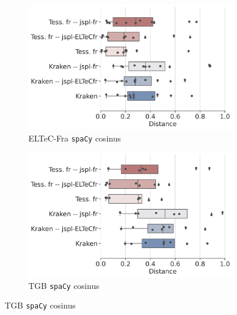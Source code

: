 \begin{figure}[h!]

    \begin{subfigure}{0.45\textwidth}
  \includegraphics[height=.65\textwidth]{IMAGES/Boite-moustache/ELTeC-Fra_spacy3.5.1_cosinus.png} 
        \caption{ELTeC-Fra \texttt{spaCy} cosinus}
   \end{subfigure}
     \begin{subfigure}{0.5\textwidth}
  \includegraphics[height=.65\textwidth]{IMAGES/Boite-moustache/TGB_spaCy3.5.1_cosinus.png} 
        \caption{TGB \texttt{spaCy} cosinus}
   \end{subfigure}
   

\end{figure}
